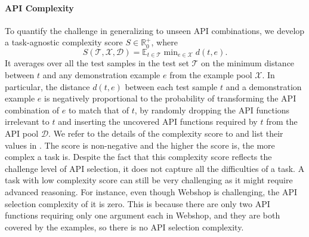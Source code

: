 \paragraph{API Complexity} 
To quantify the challenge in generalizing to unseen API combinations, we develop a task-agnostic complexity score $S\in \mathbb{R}_0^+$, where 
\begin{equation}
    S(\mathcal{T}, \mathcal{X}, \mathcal{D}) = \mathbb{E}_{t \in \mathcal{T}}\min\nolimits_{e \in \mathcal{X}} d(t, e).
\end{equation}
It averages over all the test samples in the test set $\mathcal{T}$ on the minimum distance between $t$ and any demonstration example $e$ from the example pool $\mathcal{X}$.
In particular, the distance $d(t, e)$ between each test sample $t$ and a demonstration example $e$ is negatively proportional to the probability of transforming the API combination of $e$ to match that of $t$, by randomly dropping the API functions irrelevant to $t$ and inserting the uncovered API functions required by $t$ from the API pool $\mathcal{D}$.
We refer to the details of the complexity score to  and list their values in .
The score is non-negative and the higher the score is, the more complex a task is. 
Despite the fact that this complexity score reflects the challenge level of API selection, it does not capture all the difficulties of a task. A task with low complexity score can still be very challenging as it might require advanced reasoning. 
For instance, even though Webshop is challenging, the API selection complexity of it is zero. This is because there are only two API functions requiring only one argument each in Webshop, and they are both covered by the examples, so there is no API selection complexity.




